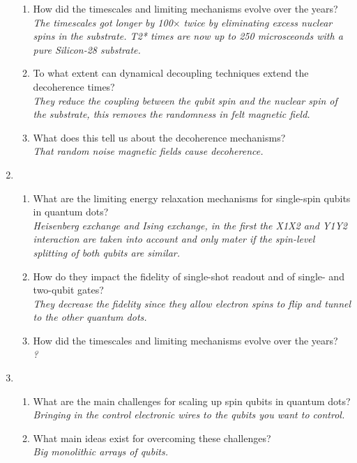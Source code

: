 \documentclass[a4paper]{scrartcl}
\newcommand{\qa}[2]{#1\\ \textit{#2}}
\begin{document}
\begin{enumerate}[label=(\alph*)]
\begin{enumerate}[label=(\roman*)]
    \item \qa{How did the timescales and limiting mechanisms evolve over the years?}{The timescales got longer by 100}$\times$ \textit{twice by eliminating excess nuclear spins in the substrate. T2* times are now up to 250 microsceonds with a pure Silicon-28 substrate.}
    \item \qa{To what extent can dynamical decoupling techniques extend the decoherence times?}{They reduce the coupling between the qubit spin and the nuclear spin of the substrate, this removes the randomness in felt magnetic field.}
    \item \qa{What does this tell us about the decoherence mechanisms?}{That random noise magnetic fields cause decoherence.}
  \end{enumerate}
  \item \begin{enumerate}[label=(\roman*)]
    \item \qa{What are the limiting energy relaxation mechanisms for single-spin qubits in quantum dots?}{Heisenberg exchange and Ising exchange, in the first the X1X2 and Y1Y2 interaction are taken into account and only mater if the spin-level splitting of both qubits are similar.}
    \item \qa{How do they impact the fidelity of single-shot readout and of single- and two-qubit gates?}{They decrease the fidelity since they allow electron spins to flip and tunnel to the other quantum dots.}
    \item \qa{How did the timescales and limiting mechanisms evolve over the years?}{?}
  \end{enumerate}
  \item \begin{enumerate}[label=(\roman*)]
    \item \qa{What are the main challenges for scaling up spin qubits in quantum dots?}{Bringing in the control electronic wires to the qubits you want to control.}
    \item \qa{What main ideas exist for overcoming these challenges?}{Big monolithic arrays of qubits.}
  \end{enumerate}
\end{enumerate}
\end{document}

